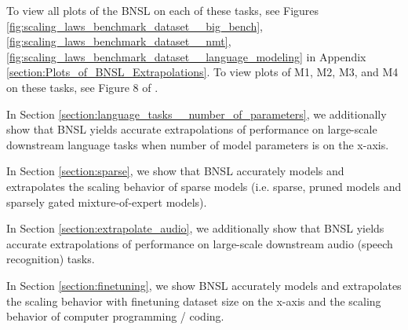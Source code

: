 \documentclass{article} %
\begin{document}



\vspace{-1.8mm}

To view all plots of the BNSL on each of these tasks, see Figures
\ref{fig:scaling_laws_benchmark_dataset__big_bench},
\ref{fig:scaling_laws_benchmark_dataset__nmt},
\ref{fig:scaling_laws_benchmark_dataset__language_modeling} in Appendix \ref{section:Plots_of_BNSL_Extrapolations}. To view plots of M1, M2, M3, and M4 on these tasks, see Figure 8 of \cite{Alabdulmohsi2022revisiting}.

\vspace{-0.6mm}

In Section \ref{section:language_tasks__number_of_parameters}, we additionally show that BNSL yields accurate extrapolations of performance on large-scale downstream language tasks when number of model parameters is on the x-axis.

\vspace{-2.1mm}

In Section \ref{section:sparse}, we show that BNSL accurately models and extrapolates the scaling behavior of sparse models (i.e. sparse, pruned models and sparsely gated mixture-of-expert models).

\vspace{-2.1mm}

In Section \ref{section:extrapolate_audio}, we additionally show that BNSL yields accurate extrapolations of performance on large-scale downstream audio (speech recognition) tasks.

\vspace{-2.1mm}

In Section \ref{section:finetuning}, we show BNSL accurately models and extrapolates the scaling behavior with finetuning dataset size on the x-axis and the scaling behavior of computer programming / coding.
\end{document}

